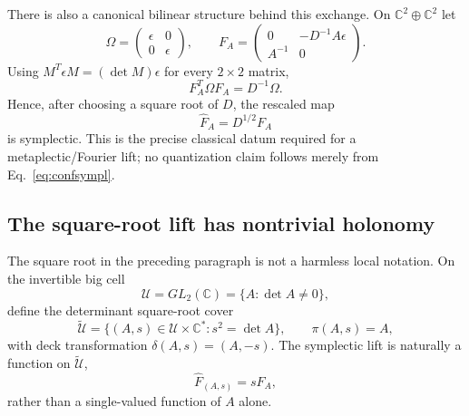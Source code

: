\documentclass[11pt]{article}
\theoremstyle{definition}\newtheorem{definition}[theorem]{Definition}
\theoremstyle{remark}\newtheorem{remark}[theorem]{Remark}\newtheorem{conjecture}[theorem]{Conjecture}
\begin{document}
There is also a canonical bilinear structure behind this exchange. On
$\mathbb C^2\oplus\mathbb C^2$ let
\begin{equation}
 \Omega=
 \begin{pmatrix}\epsilon&0\\0&\epsilon\end{pmatrix},
 \qquad
 F_A=
 \begin{pmatrix}
 0&-D^{-1}A\epsilon\\
 A^{-1}&0
 \end{pmatrix}.
\end{equation}
Using $M^T\epsilon M=(\det M)\epsilon$ for every $2\times2$ matrix,
\begin{equation}\label{eq:confsympl}
 \boxed{F_A^T\Omega F_A=D^{-1}\Omega.}
\end{equation}
Hence, after choosing a square root of $D$, the rescaled map
\begin{equation}
 \widehat F_A=D^{1/2}F_A
\end{equation}
is symplectic. This is the precise classical datum required for a metaplectic/Fourier lift; no quantization claim follows merely from Eq.~\eqref{eq:confsympl}.


\subsection{The square-root lift has nontrivial holonomy}\label{subsec:sqrtmonodromy}
The square root in the preceding paragraph is not a harmless local notation. On the invertible big cell
\begin{equation}
 \mathcal U=GL_2(\mathbb C)=\{A:\det A\neq0\},
\end{equation}
define the determinant square-root cover
\begin{equation}\label{eq:sqrtcover}
 \widetilde{\mathcal U}
 =\{(A,s)\in\mathcal U\times\mathbb C^*:s^2=\det A\},
 \qquad
 \pi(A,s)=A,
\end{equation}
with deck transformation $\delta(A,s)=(A,-s)$. The symplectic lift is naturally a function on $\widetilde{\mathcal U}$,
\begin{equation}
 \widehat F_{(A,s)}=sF_A,
\end{equation}
rather than a single-valued function of $A$ alone.
\end{document}
